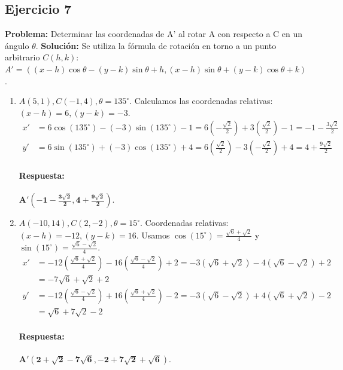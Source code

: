 \documentclass[12pt, letterpaper]{article}
\begin{document}
\subsection{Ejercicio 7}
\textbf{Problema:} Determinar las coordenadas de A' al rotar A con respecto a C en un ángulo $\theta$.
\textbf{Solución:} Se utiliza la fórmula de rotación en torno a un punto arbitrario $C(h,k)$:
$A' = ((x-h)\cos\theta - (y-k)\sin\theta + h, (x-h)\sin\theta + (y-k)\cos\theta + k)$.
\begin{enumerate}[label=\alph*)]
    \item $A(5,1), C(-1,4), \theta=135^\circ$. Calculamos las coordenadas relativas: $(x-h)=6, (y-k)=-3$.
    \begin{align*}
        x' &= 6\cos(135^\circ) - (-3)\sin(135^\circ) - 1 = 6(-\frac{\sqrt{2}}{2}) + 3(\frac{\sqrt{2}}{2}) - 1 = -1 - \frac{3\sqrt{2}}{2} \\
        y' &= 6\sin(135^\circ) + (-3)\cos(135^\circ) + 4 = 6(\frac{\sqrt{2}}{2}) - 3(-\frac{\sqrt{2}}{2}) + 4 = 4 + \frac{9\sqrt{2}}{2}
    \end{align*}
    \paragraph{Respuesta:} $\mathbf{A'\left( -1-\frac{3\sqrt{2}}{2}, 4+\frac{9\sqrt{2}}{2} \right)}$.
    
    \item $A(-10,14), C(2,-2), \theta=15^\circ$. Coordenadas relativas: $(x-h)=-12, (y-k)=16$. Usamos $\cos(15^\circ)=\frac{\sqrt{6}+\sqrt{2}}{4}$ y $\sin(15^\circ)=\frac{\sqrt{6}-\sqrt{2}}{4}$.
    \begin{align*}
        x' &= -12(\frac{\sqrt{6}+\sqrt{2}}{4}) - 16(\frac{\sqrt{6}-\sqrt{2}}{4}) + 2 = -3(\sqrt{6}+\sqrt{2}) - 4(\sqrt{6}-\sqrt{2}) + 2 \\
           &= -7\sqrt{6}+\sqrt{2}+2 \\
        y' &= -12(\frac{\sqrt{6}-\sqrt{2}}{4}) + 16(\frac{\sqrt{6}+\sqrt{2}}{4}) - 2 = -3(\sqrt{6}-\sqrt{2}) + 4(\sqrt{6}+\sqrt{2}) - 2 \\
           &= \sqrt{6}+7\sqrt{2}-2
    \end{align*}
    \paragraph{Respuesta:} $\mathbf{A'(2+\sqrt{2}-7\sqrt{6}, -2+7\sqrt{2}+\sqrt{6})}$.
\end{enumerate}
\end{document}
